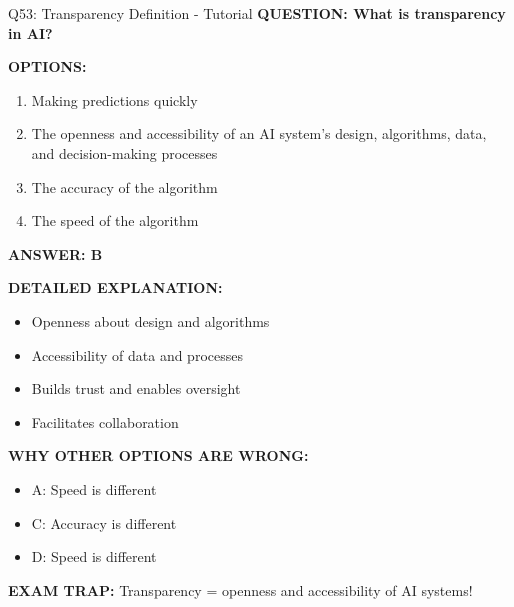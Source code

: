 \documentclass[8pt]{beamer}
\begin{document}
	\begin{frame}{Q53: Transparency Definition - Tutorial}
		\fontsize{6.5}{7.5}\selectfont
		\textbf{QUESTION: What is transparency in AI?}
		
		\vspace{0.1cm}
		\textbf{OPTIONS:}
		\begin{enumerate}
			\item Making predictions quickly
			\item The openness and accessibility of an AI system's design, algorithms, data, and decision-making processes
			\item The accuracy of the algorithm
			\item The speed of the algorithm
		\end{enumerate}
		
		\vspace{0.1cm}
		\textcolor{myblue}{\textbf{ANSWER: B}}
		
		\vspace{0.1cm}
		\textbf{DETAILED EXPLANATION:}
		\begin{itemize}
			\item Openness about design and algorithms
			\item Accessibility of data and processes
			\item Builds trust and enables oversight
			\item Facilitates collaboration
		\end{itemize}
		
		\vspace{0.1cm}
		\textcolor{myred}{\textbf{WHY OTHER OPTIONS ARE WRONG:}}
		\begin{itemize}
			\item \textcolor{myred}{A:} Speed is different
			\item \textcolor{myred}{C:} Accuracy is different
			\item \textcolor{myred}{D:} Speed is different
		\end{itemize}
		
		\textcolor{myred}{\textbf{EXAM TRAP:}} Transparency = \textcolor{myblue}{openness and accessibility} of AI systems!
	\end{frame}
	
\end{document}
